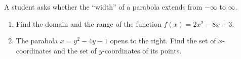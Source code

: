 A student asks whether the ``width'' of a parabola extends from $-\infty$ to $\infty$.
\begin{enumerate}
\item[(a)] Find the domain and the range of the function $f(x)=2x^2-8x+3$.
\item[(b)] The parabola $x=y^2-4y+1$ opens to the right. Find the set of $x$-coordinates and the set of $y$-coordinates of its points.
\end{enumerate}
